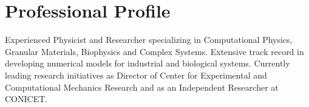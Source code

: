 \section*{Professional Profile}

Experienced Physicist and Researcher specializing in Computational Physics, Granular Materials, Biophysics and Complex Systems. Extensive track record in developing numerical models for industrial and biological systems. Currently leading research initiatives as Director of Center for Experimental and Computational Mechanics Research  and as an Independent Researcher at
CONICET.
